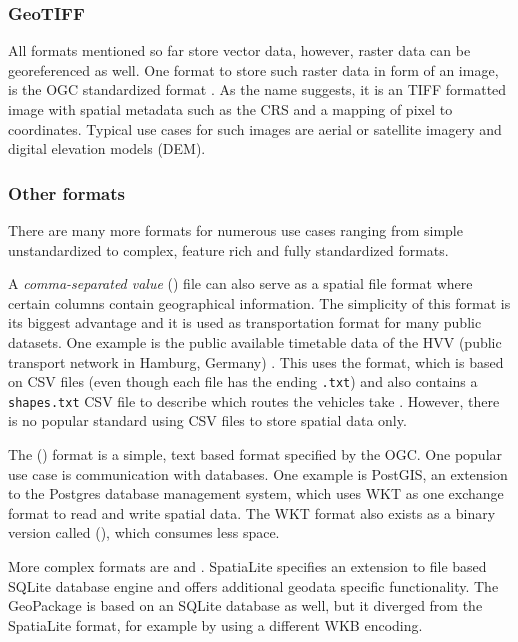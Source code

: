 		\subsubsection{GeoTIFF}
		
			All formats mentioned so far store vector data, however, raster data can be georeferenced as well.
			One format to store such raster data in form of an image, is the OGC standardized  format \cite{ogc-geotiff}.
			As the name suggests, it is an TIFF formatted image with spatial metadata such as the CRS and a mapping of pixel to coordinates.
			Typical use cases for such images are aerial or satellite imagery and digital elevation models (DEM).
		
		\subsubsection{Other formats}
		
			There are many more formats for numerous use cases ranging from simple unstandardized to complex, feature rich and fully standardized formats.
			
			A \emph{comma-separated value} () file can also serve as a spatial file format where certain columns contain geographical information.
			The simplicity of this format is its biggest advantage and it is used as transportation format for many public datasets.
			One example is the public available timetable data of the HVV (public transport network in Hamburg, Germany) \cite{hvv-fahrplandaten}.
			This uses the  format, which is based on CSV files (even though each file has the ending \texttt{.txt}) and also contains a \texttt{shapes.txt} CSV file to describe which routes the vehicles take \cite{google-gtfs}.
			However, there is no popular standard using CSV files to store spatial data only.
			
			The  () format is a simple, text based format specified by the OGC\cite[51]{ogc-sfa}.
			One popular use case is communication with databases.
			One example is PostGIS, an extension to the Postgres database management system, which uses WKT as one exchange format to read and write spatial data\cite{postgis-doc-wkt}.
			The WKT format also exists as a binary version called  (), which consumes less space.
			
			More complex formats are  and .
			SpatiaLite specifies an extension to file based SQLite database engine and offers additional geodata specific functionality\cite{spatialite-website}.
			The GeoPackage is based on an SQLite database as well, but it diverged from the SpatiaLite format, for example by using a different WKB encoding\cite{geopackage-faq}.
			
